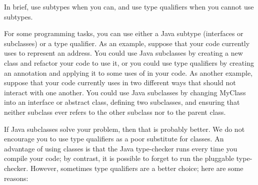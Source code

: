 
\label{when-to-use-type-qualifiers}
\label{faq-qualifiers-vs-subclasses}

In brief, use subtypes when you can, and use type qualifiers when you cannot
use subtypes.

For some programming tasks, you can use either a Java subtype (interfaces
or subclasses) or a type
qualifier.  As an example, suppose that your code currently uses  to
represent an address.  You could use Java subclasses by creating a new
 class and refactor your code to use it, or you could use
type qualifiers by creating an  annotation and applying it
to some uses of  in your code.  As another example, suppose
that your code currently uses  in two different ways that
should not interact with one another.  You could use Java subclasses by
changing MyClass into an interface or abstract class, defining two
subclasses, and ensuring that neither subclass ever refers to the other
subclass nor to the parent class.

If  Java subclasses solve your problem, then that is probably better.
We do not encourage you to use type qualifiers as a poor substitute for
classes.  An advantage of using classes is that the Java type-checker
runs every time you compile your code;
by contrast, it is possible to forget to run the pluggable
type-checker.  However, sometimes type qualifiers are a
better choice; here are some reasons:

